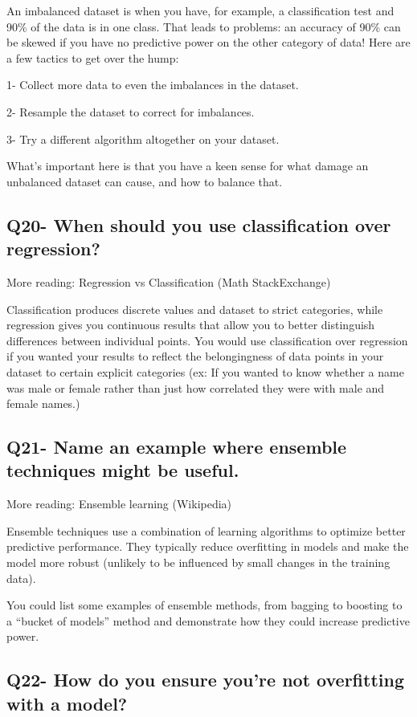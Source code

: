 \documentclass[11pt,a4paper]{article}
\begin{document}
An imbalanced dataset is when you have, for example, a classification test and 90\% of the data is in one class. That leads to problems: an accuracy of 90\% can be skewed if you have no predictive power on the other category of data! Here are a few tactics to get over the hump:

1- Collect more data to even the imbalances in the dataset.

2- Resample the dataset to correct for imbalances.

3- Try a different algorithm altogether on your dataset.

What’s important here is that you have a keen sense for what damage an unbalanced dataset can cause, and how to balance that.


\subsection{Q20- When should you use classification over regression?}

More reading: Regression vs Classification (Math StackExchange)

Classification produces discrete values and dataset to strict categories, while regression gives you continuous results that allow you to better distinguish differences between individual points. You would use classification over regression if you wanted your results to reflect the belongingness of data points in your dataset to certain explicit categories (ex: If you wanted to know whether a name was male or female rather than just how correlated they were with male and female names.)


\subsection{Q21- Name an example where ensemble techniques might be useful.}

More reading: Ensemble learning (Wikipedia)

Ensemble techniques use a combination of learning algorithms to optimize better predictive performance. They typically reduce overfitting in models and make the model more robust (unlikely to be influenced by small changes in the training data). 

You could list some examples of ensemble methods, from bagging to boosting to a “bucket of models” method and demonstrate how they could increase predictive power.


\subsection{Q22- How do you ensure you’re not overfitting with a model?}
\end{document}
